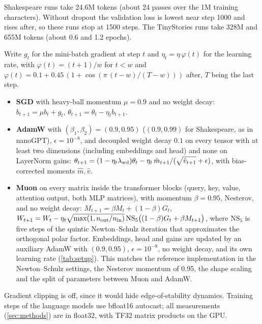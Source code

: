 \documentclass[10pt]{article}
\makeatletter
\renewcommand\paragraph{\@startsection{paragraph}{4}{\z@}{1.2ex \@plus .4ex \@minus .2ex}{-1em}{\normalfont\normalsize\bfseries}}
\makeatother
\begin{document}
Shakespeare runs take 24.6M tokens (about 24 passes over the 1M training characters). Without dropout the
validation loss is lowest near step 1000 and rises after, so these runs stop at 1500 steps. The TinyStories
runs take 328M and 655M tokens (about 0.6 and 1.2 epochs).

\paragraph{Optimizers.} Write $g_t$ for the mini-batch gradient at step $t$ and $\eta_t=\eta\,\varphi(t)$
for the learning rate, with $\varphi(t)=(t+1)/w$ for $t<w$ and
$\varphi(t)=0.1+0.45\,(1+\cos(\pi\,(t-w)/(T-w)))$ after, $T$ being the last step.
\begin{itemize}
\item \textbf{SGD} with heavy-ball momentum $\mu=0.9$ and no weight decay:
  $b_{t+1}=\mu b_t+g_t$, $\theta_{t+1}=\theta_t-\eta_t b_{t+1}$.
\item \textbf{AdamW} with $(\beta_1,\beta_2)=(0.9,0.95)$ ($(0.9,0.99)$ for Shakespeare, as in nanoGPT),
  $\epsilon=10^{-8}$, and decoupled weight decay $0.1$ on every tensor with at least two dimensions
  (including embeddings and head) and none on LayerNorm gains:
  $\theta_{t+1}=(1-\eta_t\lambda_{\rm wd})\theta_t-\eta_t\,\hat m_{t+1}/(\sqrt{\hat v_{t+1}}+\epsilon)$, with
  bias-corrected moments $\hat m,\hat v$.
\item \textbf{Muon} \citep{jordan2024muon} on every matrix inside the transformer blocks (query, key, value,
  attention output, both MLP matrices), with momentum $\beta=0.95$, Nesterov, and no weight decay:
  $M_{t+1}=\beta M_t+(1-\beta)G_t$, $W_{t+1}=W_t-\eta_t\sqrt{\max(1,n_{\rm out}/n_{\rm in})}\,
  \mathrm{NS}_5\big((1-\beta)G_t+\beta M_{t+1}\big)$, where $\mathrm{NS}_5$ is five steps of the quintic
  Newton--Schulz iteration that approximates the orthogonal polar factor. Embeddings, head and gains are
  updated by an auxiliary AdamW with $(0.9,0.95)$, $\epsilon=10^{-8}$, no weight decay, and its own learning
  rate (\cref{tab:setup}). This matches the reference implementation \citep{jordan2024muon} in the
  Newton--Schulz settings, the Nesterov momentum of 0.95, the shape scaling and the split of parameters between
  Muon and AdamW.
\end{itemize}
Gradient clipping is off, since it would hide edge-of-stability dynamics. Training steps of the language
models use bfloat16 autocast; all measurements (\cref{sec:methods}) are in float32, with TF32 matrix products on the GPU.
\end{document}
